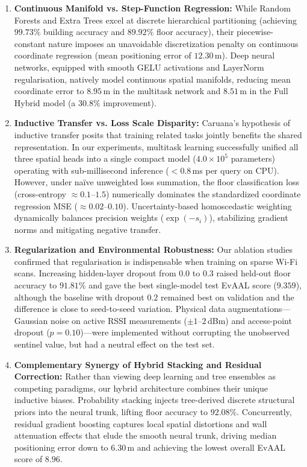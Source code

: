 \begin{enumerate}
    \item \textbf{Continuous Manifold vs. Step-Function Regression:} 
    While Random Forests and Extra Trees excel at discrete hierarchical partitioning (achieving $99.73\%$ building accuracy and $89.92\%$ floor accuracy), their piecewise-constant nature imposes an unavoidable discretization penalty on continuous coordinate regression (mean positioning error of $12.30$\,m). Deep neural networks, equipped with smooth GELU activations and LayerNorm regularisation, natively model continuous spatial manifolds, reducing mean coordinate error to $8.95$\,m in the multitask network and $8.51$\,m in the Full Hybrid model (a $30.8\%$ improvement).
    
    \item \textbf{Inductive Transfer vs. Loss Scale Disparity:}
    Caruana's hypothesis of inductive transfer posits that training related tasks jointly benefits the shared representation. In our experiments, multitask learning successfully unified all three spatial heads into a single compact model ($4.0 \times 10^5$ parameters) operating with sub-millisecond inference ($<0.8$\,ms per query on CPU). However, under na\"ive unweighted loss summation, the floor classification loss (cross-entropy $\approx 0.1\text{--}1.5$) numerically dominates the standardized coordinate regression MSE ($\approx 0.02\text{--}0.10$). Uncertainty-based homoscedastic weighting dynamically balances precision weights ($\exp(-s_i)$), stabilizing gradient norms and mitigating negative transfer.
    
    \item \textbf{Regularization and Environmental Robustness:}
    Our ablation studies confirmed that regularisation is indispensable when training on sparse Wi-Fi scans. Increasing hidden-layer dropout from $0.0$ to $0.3$ raised held-out floor accuracy to $91.81\%$ and gave the best single-model test EvAAL score ($9.359$), although the baseline with dropout $0.2$ remained best on validation and the difference is close to seed-to-seed variation. Physical data augmentations—Gaussian noise on active RSSI measurements ($\pm 1$--$2$\,dBm) and access-point dropout ($p=0.10$)—were implemented without corrupting the unobserved sentinel value, but had a neutral effect on the test set.
    
    \item \textbf{Complementary Synergy of Hybrid Stacking and Residual Correction:}
    Rather than viewing deep learning and tree ensembles as competing paradigms, our hybrid architecture combines their unique inductive biases. Probability stacking injects tree-derived discrete structural priors into the neural trunk, lifting floor accuracy to $92.08\%$. Concurrently, residual gradient boosting captures local spatial distortions and wall attenuation effects that elude the smooth neural trunk, driving median positioning error down to $6.30$\,m and achieving the lowest overall EvAAL score of $8.96$.
\end{enumerate}

